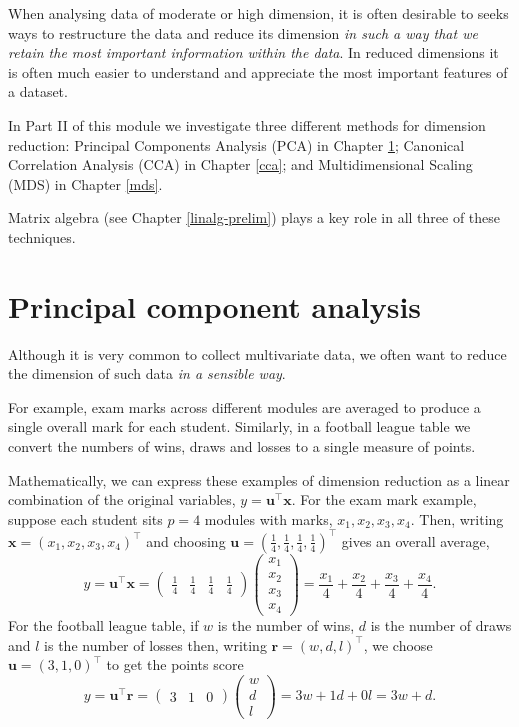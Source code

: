 \documentclass[]{book}
\theoremstyle{definition}
\theoremstyle{definition}
\theoremstyle{definition}
\theoremstyle{remark}
\begin{document}
When analysing data of moderate or high dimension, it is often desirable to seeks ways to restructure the data and reduce its dimension \emph{in such a way that we retain the most important information within the data}. In reduced dimensions it is often much easier to understand and appreciate the most important features of a dataset.

In Part II of this module we investigate three different methods for dimension reduction: Principal Components Analysis (PCA) in Chapter \ref{pca}; Canonical Correlation Analysis (CCA) in Chapter \ref{cca}; and Multidimensional Scaling (MDS) in Chapter \ref{mds}.

Matrix algebra (see Chapter \ref{linalg-prelim}) plays a key role in all three of these techniques.

\hypertarget{pca}{%
\chapter{Principal component analysis}\label{pca}}

Although it is very common to collect multivariate data, we often want to reduce the dimension of such data \emph{in a sensible way}.

For example, exam marks across different modules are
averaged to produce a single overall mark for each
student. Similarly, in a football league table we convert the
numbers of wins, draws and losses to a single measure of
points.

Mathematically, we can express these examples of
dimension reduction as a linear combination of the
original variables, \(y = \boldsymbol u^\top \boldsymbol x\). For the exam mark
example, suppose each student sits \(p=4\) modules
with marks, \(x_1,x_2,x_3,x_4\). Then, writing \(\boldsymbol x=(x_1, x_2 , x_3, x_4)^\top\) and choosing \(\boldsymbol u= \left(\frac{1}{4}, \frac{1}{4}, \frac{1}{4}, \frac{1}{4} \right)^\top\)
gives an overall average,
\[ y =\boldsymbol u^\top \boldsymbol x= \begin{pmatrix} \frac{1}{4} & \frac{1}{4} & \frac{1}{4} & \frac{1}{4} \end{pmatrix} \begin{pmatrix} x_1 \\ x_2 \\ x_3 \\ x_4 \end{pmatrix} = \frac{x_1}{4} + \frac{x_2}{4} + \frac{x_3}{4} + \frac{x_4}{4}.\]
For the football league table, if \(w\) is the number of wins, \(d\) is the number of draws and \(l\) is the number of losses then, writing
\({\mathbf r}=(w,d,l)^\top\), we choose \(\boldsymbol u= \left(3,1,0 \right)^\top\) to get the points score
\[ y = \boldsymbol u^\top {\mathbf r}=\begin{pmatrix} 3 & 1 & 0 \end{pmatrix} \begin{pmatrix} w \\ d \\ l \end{pmatrix} = 3w + 1d + 0l=3w+d.\]
\end{document}
